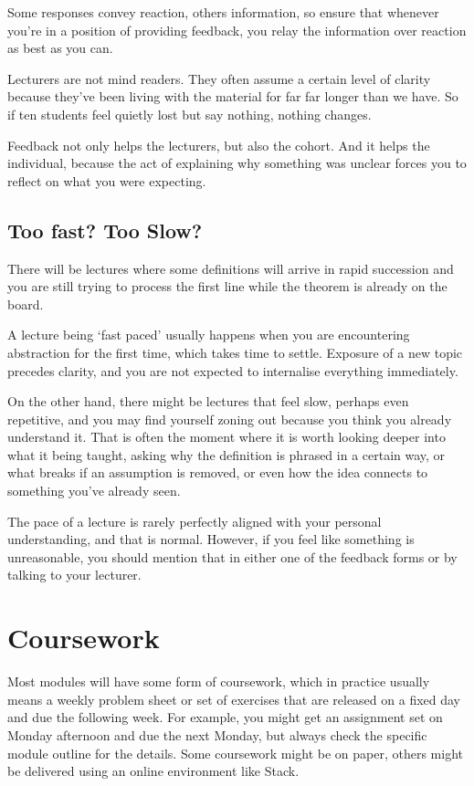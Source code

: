 Some responses convey reaction, others information, so ensure that whenever you're in a position of providing feedback, you relay the information over reaction as best as you can. 

Lecturers are not mind readers. They often assume a certain level of clarity because they've been living with the material for far far longer than we have. So if ten students feel quietly lost but say nothing, nothing changes. 

Feedback not only helps the lecturers, but also the cohort. And it helps the individual, because the act of explaining why something was unclear forces you to reflect on what you were expecting. 

\subsection{Too fast? Too Slow?}

There will be lectures where some definitions will arrive in rapid succession and you are still trying to process the first line while the theorem is already on the board. 

A lecture being `fast paced' usually happens when you are encountering abstraction for the first time, which takes time to settle. Exposure of a new topic precedes clarity, and you are not expected to internalise everything immediately. 

On the other hand, there might be lectures that feel slow, perhaps even repetitive, and you may find yourself zoning out because you think you already understand it. That is often the moment where it is worth looking deeper into what it being taught, asking why the definition is phrased in a certain way, or what breaks if an assumption is removed, or even how the idea connects to something you've already seen. 

The pace of a lecture is rarely perfectly aligned with your personal understanding, and that is normal. However, if you feel like something is unreasonable, you should mention that in either one of the feedback forms or by talking to your lecturer. 

\section{Coursework}

Most modules will have some form of coursework, which in practice usually means a weekly problem sheet or set of exercises that are released on a fixed day and due the following week. For example, you might get an assignment set on Monday afternoon and due the next Monday, but always check the specific module outline for the details. Some coursework might be on paper, others might be delivered using an online environment like Stack. 

